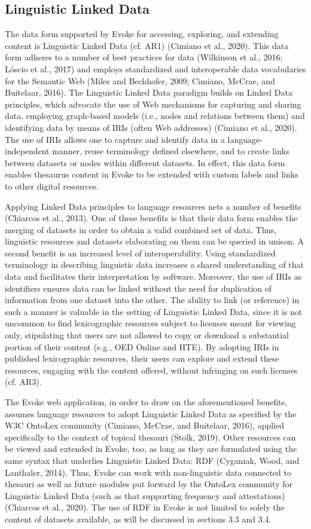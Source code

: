 \subsection{Linguistic Linked Data}
The data form supported by Evoke for accessing, exploring, and extending content is Linguistic Linked Data (cf. AR1) (Cimiano et al., 2020). This data form adheres to a number of best practices for data (Wilkinson et al., 2016; Lóscio et al., 2017) and employs standardized and interoperable data vocabularies for the Semantic Web (Miles and Bechhofer, 2009; Cimiano, McCrae, and Buitelaar, 2016). The Linguistic Linked Data paradigm builds on Linked Data principles, which advocate the use of Web mechanisms for capturing and sharing data, employing graph-based models (i.e., nodes and relations between them) and identifying data by means of IRIs (often Web addresses) (Cimiano et al., 2020). The use of IRIs allows one to capture and identify data in a language-independent manner, reuse terminology defined elsewhere, and to create links between datasets or nodes within different datasets. In effect, this data form enables thesaurus content in Evoke to be extended with custom labels and links to other digital resources.

Applying Linked Data principles to language resources nets a number of benefits (Chiarcos et al., 2013). One of these benefits is that their data form enables the merging of datasets in order to obtain a valid combined set of data. Thus, linguistic resources and datasets elaborating on them can be queried in unison. A second benefit is an increased level of interoperability. Using standardized terminology in describing linguistic data increases a shared understanding of that data and facilitates their interpretation by software. Moreover, the use of IRIs as identifiers ensures data can be linked without the need for duplication of information from one dataset into the other. The ability to link (or reference) in such a manner is valuable in the setting of Linguistic Linked Data, since it is not uncommon to find lexicographic resources subject to licenses meant for viewing only, stipulating that users are not allowed to copy or download a substantial portion of their content (e.g., OED Online and HTE). By adopting IRIs in published lexicographic resources, their users can explore and extend these resources, engaging with the content offered, without infringing on such licenses (cf. AR3).

The Evoke web application, in order to draw on the aforementioned benefits, assumes language resources to adopt Linguistic Linked Data as specified by the W3C OntoLex community (Cimiano, McCrae, and Buitelaar, 2016), applied specifically to the context of topical thesauri (Stolk, 2019). Other resources can be viewed and extended in Evoke, too, as long as they are formulated using the same syntax that underlies Linguistic Linked Data: RDF (Cyganiak, Wood, and Lanthaler, 2014). Thus, Evoke can work with non-linguistic data connected to thesauri as well as future modules put forward by the OntoLex community for Linguistic Linked Data (such as that supporting frequency and attestations) (Chiarcos et al., 2020). The use of RDF in Evoke is not limited to solely the content of datasets available, as will be discussed in sections 3.3 and 3.4.

